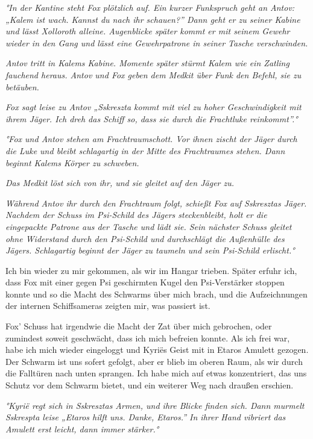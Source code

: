 \documentclass[11pt]{article}
\begin{document}
\emph{°In der Kantine steht Fox plötzlich auf. Ein kurzer Funkspruch
geht an Antov: „Kalem ist wach. Kannst du nach ihr schauen?'' Dann geht
er zu seiner Kabine und lässt Xolloroth alleine. Augenblicke später
kommt er mit seinem Gewehr wieder in den Gang und lässt eine
Gewehrpatrone in seiner Tasche verschwinden.}

\emph{Antov tritt in Kalems Kabine. Momente später stürmt Kalem wie ein
Zatling fauchend heraus. Antov und Fox geben dem Medkit über Funk den
Befehl, sie zu betäuben.}

\emph{Fox sagt leise zu Antov „Sskreszta kommt mit viel zu hoher
Geschwindigkeit mit ihrem Jäger. Ich dreh das Schiff so, dass sie durch
die Frachtluke reinkommt''.°}

\emph{°Fox und Antov stehen am Frachtraumschott. Vor ihnen zischt der
Jäger durch die Luke und bleibt schlagartig in der Mitte des
Frachtraumes stehen. Dann beginnt Kalems Körper zu schweben.}

\emph{Das Medkit löst sich von ihr, und sie gleitet auf den Jäger zu.}

\emph{Während Antov ihr durch den Frachtraum folgt, schießt Fox auf
Sskresztas Jäger. Nachdem der Schuss im Psi-Schild des Jägers
steckenbleibt, holt er die eingepackte Patrone aus der Tasche und lädt
sie. Sein nächster Schuss gleitet ohne Widerstand durch den Psi-Schild
und durchschlägt die Außenhülle des Jägers. Schlagartig beginnt der
Jäger zu taumeln und sein Psi-Schild erlischt.°}

Ich bin wieder zu mir gekommen, als wir im Hangar trieben. Später erfuhr
ich, dass Fox mit einer gegen Psi geschirmten Kugel den Psi-Verstärker
stoppen konnte und so die Macht des Schwarms über mich brach, und die
Aufzeichnungen der internen Schiffsameras zeigten mir, was passiert ist.

Fox' Schuss hat irgendwie die Macht der Zat über mich gebrochen, oder
zumindest soweit geschwächt, dass ich mich befreien konnte. Als ich frei
war, habe ich mich wieder eingeloggt und Kyriës Geist mit in Etaros
Amulett gezogen. Der Schwarm ist uns sofert gefolgt, aber er blieb im
oberen Raum, als wir durch die Falltüren nach unten sprangen. Ich habe
mich auf etwas konzentriert, das uns Schutz vor dem Schwarm bietet, und
ein weiterer Weg nach draußen erschien.

\emph{°Kyrië regt sich in Sskresztas Armen, und ihre Blicke finden sich.
Dann murmelt Sskrespta leise „Etaros hilft uns. Danke, Etaros.'' In
ihrer Hand vibriert das Amulett erst leicht, dann immer stärker.°}
\end{document}
